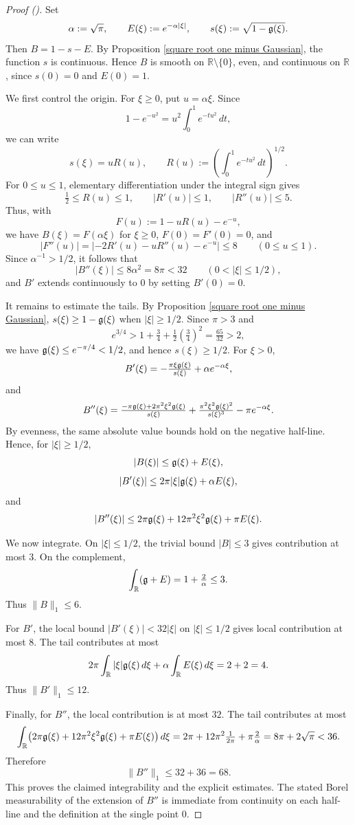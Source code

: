 \documentclass[12pt,reqno]{amsart}
\newcommand{\auto}{{({\tiny\faCar})}}
\theoremstyle{plain}
\numberwithin{equation}{section}
\theoremstyle{remark}
\newcommand{\R}{{\mathbb R}}
\begin{document}
\begin{proof}[Proof \auto]
Set
\[
    \alpha:=\sqrt{\pi},\qquad
    E(\xi):=e^{-\alpha|\xi|},\qquad
    s(\xi):=\sqrt{1-\mathfrak{g}(\xi)}.
\]
Then \(B=1-s-E\). By Proposition \ref{square root one minus Gaussian}, the function $s$ is continuous. Hence \(B\) is smooth on \(\R\setminus\{0\}\), even, and continuous on \(\R\), since \(s(0)=0\) and \(E(0)=1\).

We first control the origin. For \(\xi\ge0\), put \(u=\alpha \xi\). Since
\[
    1-e^{-u^2}=u^2\int_0^1 e^{-tu^2}\,dt,
\]
we can write
\[
    s(\xi)=uR(u),\qquad
    R(u):=\left(\int_0^1 e^{-tu^2}\,dt\right)^{1/2}.
\]
For \(0\le u\le1\), elementary differentiation under the integral sign gives
\[
    \tfrac12\le R(u)\le1,\qquad |R'(u)|\le1,\qquad |R''(u)|\le5.
\]
Thus, with
\[
    F(u):=1-uR(u)-e^{-u},
\]
we have \(B(\xi)=F(\alpha\xi)\) for \(\xi\ge0\), \(F(0)=F'(0)=0\), and
\[
    |F''(u)|
    =
    |-2R'(u)-uR''(u)-e^{-u}|
    \le 8
    \qquad (0\le u\le1).
\]
Since \(\alpha^{-1}>1/2\), it follows that
\[
    |B''(\xi)|\le 8\alpha^2=8\pi<32
    \qquad (0<|\xi|\le1/2),
\]
and \(B'\) extends continuously to \(0\) by setting \(B'(0)=0\).

It remains to estimate the tails. By Proposition \ref{square root one minus Gaussian},
$s(\xi)\ge1-\mathfrak{g}(\xi)$ when $|\xi|\ge1/2$. Since $\pi>3$ and
\[
e^{3/4}>1+\tfrac34+\tfrac12\left(\tfrac34\right)^2=\tfrac{65}{32}>2,
\]
we have $\mathfrak{g}(\xi)\le e^{-\pi/4}<1/2$, and hence $s(\xi)\ge1/2$. For \(\xi>0\),
\[
    B'(\xi)
    =
    -\tfrac{\pi\xi\mathfrak{g}(\xi)}{s(\xi)}
    +
    \alpha e^{-\alpha\xi},
\]
and
\[
    B''(\xi)
    =
    \tfrac{-\pi\mathfrak{g}(\xi)+2\pi^2\xi^2\mathfrak{g}(\xi)}{s(\xi)}
    +
    \tfrac{\pi^2\xi^2\mathfrak{g}(\xi)^2}{s(\xi)^3}
    -
    \pi e^{-\alpha\xi}.
\]
By evenness, the same absolute value bounds hold on the negative half-line. Hence, for
\(|\xi|\ge1/2\),
\[
    |B(\xi)|\le \mathfrak{g}(\xi)+E(\xi),
\]
\[
    |B'(\xi)|\le 2\pi|\xi|\mathfrak{g}(\xi)+\alpha E(\xi),
\]
and
\[
    |B''(\xi)|
    \le
    2\pi\mathfrak{g}(\xi)+12\pi^2\xi^2\mathfrak{g}(\xi)+\pi E(\xi).
\]

We now integrate. On \(|\xi|\le1/2\), the trivial bound \(|B|\le3\) gives contribution at
most \(3\). On the complement,
\[
    \int_\R(\g+E)
    =
    1+\tfrac{2}{\alpha}
    \le3.
\]
Thus \(\|B\|_1\le6\).

For \(B'\), the local bound \(|B'(\xi)|<32|\xi|\) on \(|\xi|\le1/2\) gives local
contribution at most \(8\). The tail contributes at most
\[
    2\pi\int_\R |\xi|\g(\xi)\,d\xi
    +
    \alpha\int_\R E(\xi)\,d\xi
    =
    2+2=4.
\]
Thus \(\|B'\|_1\le12\).

Finally, for \(B''\), the local contribution is at most \(32\). The tail contributes at most
\[
\int_\R \bigl(2\pi\g(\xi)+12\pi^2\xi^2\g(\xi)+\pi E(\xi)\bigr)\,d\xi = 2\pi+12\pi^2\tfrac{1}{2\pi}+\pi\tfrac{2}{\alpha} = 8\pi+2\sqrt{\pi}<36.
\]
Therefore
\[
    \|B''\|_1\le 32+36=68.
\]
This proves the claimed integrability and the explicit estimates. The stated Borel measurability
of the extension of \(B''\) is immediate from continuity on each half-line and the definition at
the single point \(0\).
\end{proof}
\end{document}

